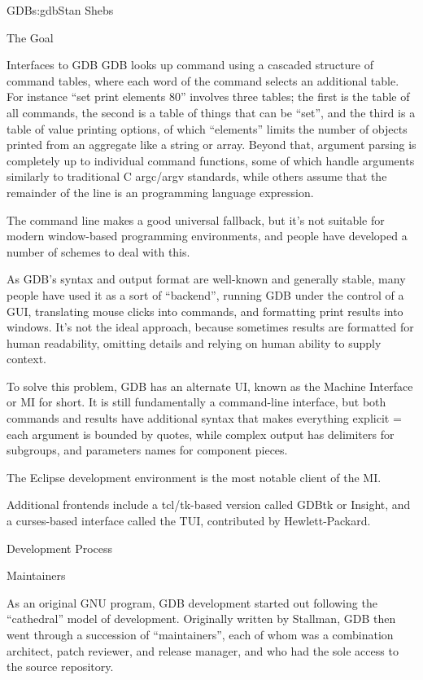 \begin{aosachapter}{GDB}{s:gdb}{Stan Shebs}
\begin{aosasect1}{The Goal}
\begin{aosasect1}{Interfaces to GDB}
GDB looks up command using a cascaded structure of command tables,
where each word of the command selects an additional table.  For
instance ``set print elements 80'' involves three tables; the first is
the table of all commands, the second is a table of things that can be
``set'', and the third is a table of value printing options, of which
``elements'' limits the number of objects printed from an aggregate
like a string or array.  Beyond that, argument parsing is completely
up to individual command functions, some of which handle arguments
similarly to traditional C argc/argv standards, while others assume
that the remainder of the line is an programming language expression.

The command line makes a good universal fallback, but it's not suitable
for modern window-based programming environments, and people have developed
a number of schemes to deal with this.

As GDB's syntax and output format are well-known and generally stable,
many people have used it as a sort of ``backend'', running GDB under the
control of a GUI, translating mouse clicks into commands, and
formatting print results into windows.  It's not the ideal approach,
because sometimes results are formatted for human readability, omitting
details and relying on human ability to supply context.

To solve this problem, GDB has an alternate UI, known as the Machine
Interface or MI for short.  It is still fundamentally a command-line
interface, but both commands and results have additional syntax that
makes everything explicit = each argument is bounded by quotes, while
complex output has delimiters for subgroups, and parameters names for
component pieces.


The Eclipse development environment is the most notable client of the
MI.

Additional frontends include a tcl/tk-based version called GDBtk or
Insight, and a curses-based interface called the TUI, contributed by
Hewlett-Packard.

\end{aosasect1}

\begin{aosasect1}{Development Process}

\end{aosasect1}

\begin{aosasect1}{Maintainers}

As an original GNU program, GDB development started out following the
``cathedral'' model of development.  Originally written by Stallman,
GDB then went through a succession of ``maintainers'', each of whom
was a combination architect, patch reviewer, and release manager, and
who had the sole access to the source repository.


\end{aosasect1}
\end{aosasect1}
\end{aosachapter}
